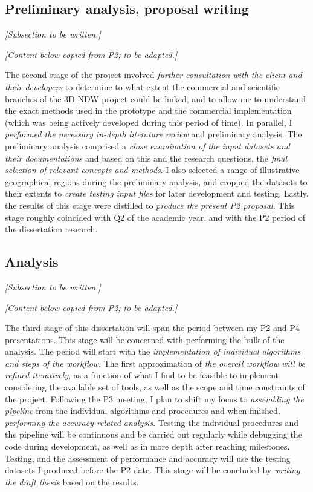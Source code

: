 \subsection{Preliminary analysis, proposal writing}
\label{sub:preliminaryanalysis}

\textit{[Subsection to be written.]}

\textit{[Content below copied from P2; to be adapted.]}

The second stage of the project involved \textit{further consultation with the client and their developers} to determine to what extent the commercial and scientific branches of the 3D-NDW project could be linked, and to allow me to understand the exact methods used in the prototype and the commercial implementation (which was being actively developed during this period of time). In parallel, I \textit{performed the necessary in-depth literature review} and preliminary analysis. The preliminary analysis comprised a \textit{close examination of the input datasets and their documentations} and based on this and the research questions, the \textit{final selection of relevant concepts and methods}. I also selected a range of illustrative geographical regions during the preliminary analysis, and cropped the datasets to their extents to \textit{create testing input files} for later development and testing. Lastly, the results of this stage were distilled to \textit{produce the present P2 proposal}. This stage roughly coincided with Q2 of the academic year, and with the P2 period of the dissertation research.

\subsection{Analysis}
\label{sub:analysis}

\textit{[Subsection to be written.]}

\textit{[Content below copied from P2; to be adapted.]}

The third stage of this dissertation will span the period between my P2 and P4 presentations. This stage will be concerned with performing the bulk of the analysis. The period will start with the \textit{implementation of individual algorithms and steps of the workflow}. The first approximation of \textit{the overall workflow will be refined iteratively}, as a function of what I find to be feasible to implement considering the available set of tools, as well as the scope and time constraints of the project. Following the P3 meeting, I plan to shift my focus to \textit{assembling the pipeline} from the individual algorithms and procedures and when finished, \textit{performing the accuracy-related analysis}. Testing the individual procedures and the pipeline will be continuous and be carried out regularly while debugging the code during development, as well as in more depth after reaching milestones. Testing, and the assessment of performance and accuracy will use the testing datasets I produced before the P2 date. This stage will be concluded by \textit{writing the draft thesis} based on the results.

